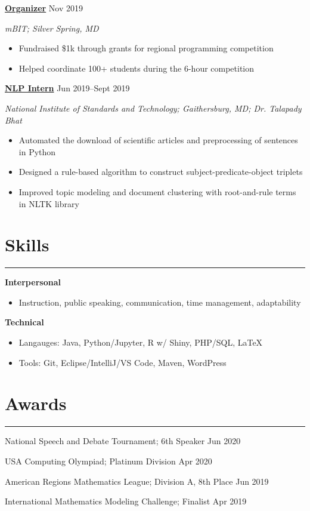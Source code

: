 \documentclass[11pt]{article}
\newcommand{\resumesection}[1]{\vspace{-0.3cm}\section*{\color{highlight}#1}\vspace{-0.3cm}\hrule\vspace{0.3cm}}
\begin{document}
\textbf{\href{https://mbit.mbhs.edu/}{Organizer}} \hfill Nov 2019 \par
\textit{mBIT; Silver Spring, MD}
\begin{itemize}
	\item Fundraised \$1k through grants for regional programming competition
	\item Helped coordinate 100+ students during the 6-hour competition
\end{itemize}\vspace{0.1cm}

\textbf{\href{https://github.com/petezh/Root-and-Rule-NLP}{NLP Intern}} \hfill Jun 2019--Sept 2019\par
\textit{National Institute of Standards and Technology; Gaithersburg, MD; Dr. Talapady Bhat}
\begin{itemize}
	\item Automated the download of scientific articles and preprocessing of sentences in Python
	\item Designed a rule-based algorithm to construct subject-predicate-object triplets
	\item Improved topic modeling and document clustering with root-and-rule terms in NLTK library
\end{itemize}\vspace{0.1cm}


\resumesection{Skills}

\textbf{Interpersonal}
\begin{itemize} 
	\item Instruction, public speaking, communication, time management, adaptability
\end{itemize}\vspace{0.1cm}

\textbf{Technical}
\begin{itemize} 
	\item Langauges: Java, Python/Jupyter, R w/ Shiny, PHP/SQL, \LaTeX
	\item Tools: Git, Eclipse/IntelliJ/VS Code, Maven, WordPress
\end{itemize}\vspace{0.1cm}

\resumesection{Awards}

National Speech and Debate Tournament; 6th Speaker \hfill Jun 2020 \par
USA Computing Olympiad; Platinum Division \hfill Apr 2020 \par
American Regions Mathematics League; Division A, 8th Place \hfill Jun 2019 \par
International Mathematics Modeling Challenge; Finalist \hfill Apr 2019\par
\end{document}

